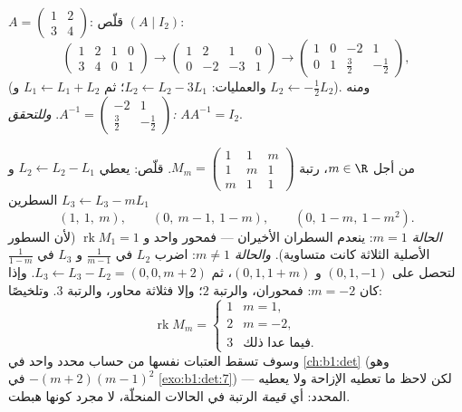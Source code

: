 \begin{example}\label{ex:b1:matrices:inverse}
$A = \begin{pmatrix} 1 & 2 \\ 3 & 4 \end{pmatrix}$: قلّص $(A \mid
I_2)$:
\[
\begin{pmatrix} 1 & 2 & 1 & 0\\ 3 & 4 & 0 & 1 \end{pmatrix}
\to
\begin{pmatrix} 1 & 2 & 1 & 0\\ 0 & -2 & -3 & 1 \end{pmatrix}
\to
\begin{pmatrix} 1 & 0 & -2 & 1\\ 0 & 1 & \tfrac32 & -\tfrac12
\end{pmatrix},
\]
(والعمليات: $L_2 \leftarrow L_2 - 3L_1$؛ ثم $L_1 \leftarrow L_1
+ L_2$ و $L_2 \leftarrow -\frac12 L_2$). ومنه $A^{-1} =
\begin{pmatrix} -2 & 1 \\ \tfrac32 & -\tfrac12\end{pmatrix}$.
\emph{وللتحقق:} $AA^{-1} = I_2$.
\end{example}

\begin{example}
\label{ex:b1:matrices:rankparameter}
من أجل $m \in \R$، رتبة
$M_m = \begin{pmatrix} 1 & 1 & m\\ 1 & m & 1\\ m & 1 &
1\end{pmatrix}$. قلّص: يعطي $L_2 \leftarrow L_2 - L_1$ و $L_3
\leftarrow L_3 - mL_1$ السطرين
\[
(1,\ 1,\ m), \qquad (0,\ m - 1,\ 1 - m), \qquad
(0,\ 1 - m,\ 1 - m^2).
\]
\emph{الحالة $m = 1$}: ينعدم السطران الأخيران --- فمحور واحد و
$\operatorname{rk} M_1 = 1$ (لأن السطور الأصلية الثلاثة كانت
متساوية). \emph{والحالة $m \neq 1$}: اضرب $L_2$ في $\frac1{m-1}$ و
$L_3$ في $\frac1{1-m}$ لتحصل على $(0, 1, -1)$ و $(0, 1, 1 + m)$،
ثم $L_3 \leftarrow L_3 - L_2 = (0, 0, m + 2)$. وإذا كان $m = -2$:
فمحوران، والرتبة $2$؛ وإلا فثلاثة محاور، والرتبة $3$. وتلخيصًا:
\[
\operatorname{rk} M_m =
\begin{cases}
1 & m = 1,\\
2 & m = -2,\\
3 & \text{فيما عدا ذلك}.
\end{cases}
\]
وسوف تسقط العتبات نفسها من حساب محدد واحد
في \cref{ch:b1:det} (وهو  $-(m+2)(m-1)^2$ في
\cref{exo:b1:det:7}) --- لكن لاحظ ما تعطيه الإزاحة ولا يعطيه
المحدد: أي \emph{قيمة} الرتبة في الحالات
المنحلّة، لا مجرد كونها هبطت.
\end{example}

